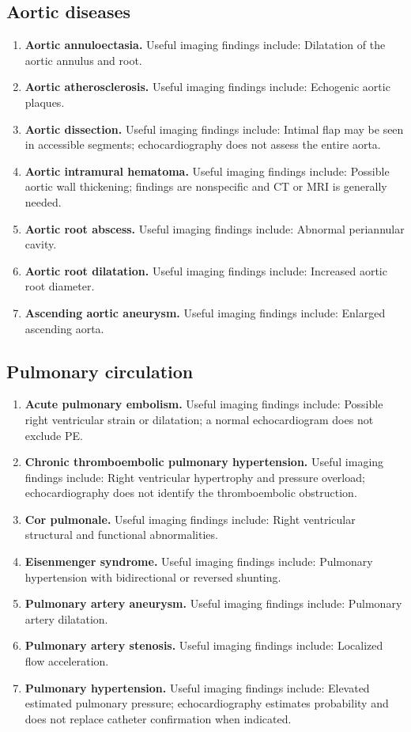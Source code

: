 \subsection{Aortic diseases}
\begin{enumerate}[leftmargin=*,itemsep=0.45em,topsep=0.4em]
\item \textbf{Aortic annuloectasia.} Useful imaging findings include: Dilatation of the aortic annulus and root.
\item \textbf{Aortic atherosclerosis.} Useful imaging findings include: Echogenic aortic plaques.
\item \textbf{Aortic dissection.} Useful imaging findings include: Intimal flap may be seen in accessible segments; echocardiography does not assess the entire aorta.
\item \textbf{Aortic intramural hematoma.} Useful imaging findings include: Possible aortic wall thickening; findings are nonspecific and CT or MRI is generally needed.
\item \textbf{Aortic root abscess.} Useful imaging findings include: Abnormal periannular cavity.
\item \textbf{Aortic root dilatation.} Useful imaging findings include: Increased aortic root diameter.
\item \textbf{Ascending aortic aneurysm.} Useful imaging findings include: Enlarged ascending aorta.
\end{enumerate}

\subsection{Pulmonary circulation}
\begin{enumerate}[leftmargin=*,itemsep=0.45em,topsep=0.4em]
\item \textbf{Acute pulmonary embolism.} Useful imaging findings include: Possible right ventricular strain or dilatation; a normal echocardiogram does not exclude PE.
\item \textbf{Chronic thromboembolic pulmonary hypertension.} Useful imaging findings include: Right ventricular hypertrophy and pressure overload; echocardiography does not identify the thromboembolic obstruction.
\item \textbf{Cor pulmonale.} Useful imaging findings include: Right ventricular structural and functional abnormalities.
\item \textbf{Eisenmenger syndrome.} Useful imaging findings include: Pulmonary hypertension with bidirectional or reversed shunting.
\item \textbf{Pulmonary artery aneurysm.} Useful imaging findings include: Pulmonary artery dilatation.
\item \textbf{Pulmonary artery stenosis.} Useful imaging findings include: Localized flow acceleration.
\item \textbf{Pulmonary hypertension.} Useful imaging findings include: Elevated estimated pulmonary pressure; echocardiography estimates probability and does not replace catheter confirmation when indicated.
\end{enumerate}

